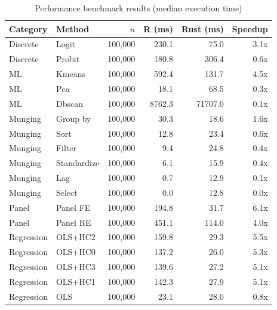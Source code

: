 \begin{table}[htbp]
\centering
\caption{Performance benchmark results (median execution time)}
\label{tab:benchmark-full}
\begin{tabular}{llrrrr}
\toprule
Category & Method & $n$ & R (ms) & Rust (ms) & Speedup \\
\midrule
Discrete & Logit & 100,000 & 230.1 & 75.0 & 3.1x \\
Discrete & Probit & 100,000 & 180.8 & 306.4 & 0.6x \\
ML & Kmeans & 100,000 & 592.4 & 131.7 & 4.5x \\
ML & Pca & 100,000 & 18.1 & 68.5 & 0.3x \\
ML & Dbscan & 100,000 & 8762.3 & 71707.0 & 0.1x \\
Munging & Group by & 100,000 & 30.3 & 18.6 & 1.6x \\
Munging & Sort & 100,000 & 12.8 & 23.4 & 0.6x \\
Munging & Filter & 100,000 & 9.4 & 24.8 & 0.4x \\
Munging & Standardize & 100,000 & 6.1 & 15.9 & 0.4x \\
Munging & Lag & 100,000 & 0.7 & 12.9 & 0.1x \\
Munging & Select & 100,000 & 0.0 & 12.8 & 0.0x \\
Panel & Panel FE & 100,000 & 194.8 & 31.7 & 6.1x \\
Panel & Panel RE & 100,000 & 451.1 & 114.0 & 4.0x \\
Regression & OLS+HC2 & 100,000 & 159.8 & 29.3 & 5.5x \\
Regression & OLS+HC0 & 100,000 & 137.2 & 26.0 & 5.3x \\
Regression & OLS+HC3 & 100,000 & 139.6 & 27.2 & 5.1x \\
Regression & OLS+HC1 & 100,000 & 142.3 & 27.9 & 5.1x \\
Regression & OLS & 100,000 & 23.1 & 28.0 & 0.8x \\
\bottomrule
\end{tabular}
\end{table}

